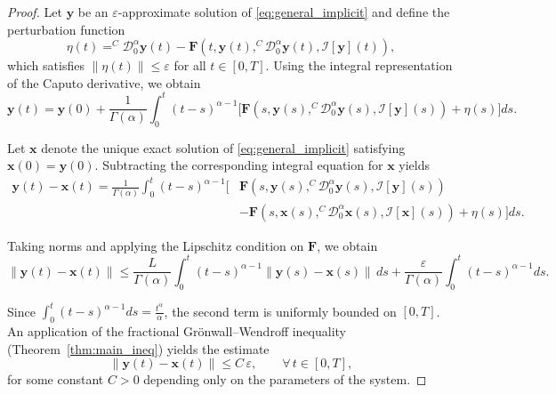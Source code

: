 \documentclass[12pt,a4paper]{article}
\numberwithin{equation}{section}
\begin{document}
	\begin{proof}
		Let $\mathbf{y}$ be an $\varepsilon$-approximate solution of \eqref{eq:general_implicit} and define the perturbation function
		\[
		\eta(t) = ^{C}\mathcal{D}_{0}^{\alpha}\mathbf{y}(t) - \mathbf{F}\!\left( t,\mathbf{y}(t), ^{C}\mathcal{D}_{0}^{\alpha}\mathbf{y}(t), \mathcal{I}[\mathbf{y}](t) \right),
		\]
		which satisfies $\|\eta(t)\|\le\varepsilon$ for all $t\in[0,T]$. Using the integral representation of the Caputo derivative, we obtain
		\begin{equation}
			\mathbf{y}(t) = \mathbf{y}(0) + \frac{1}{\Gamma(\alpha)} \int_0^t (t-s)^{\alpha-1} \Big[ \mathbf{F}\!\left( s,\mathbf{y}(s), ^{C}\mathcal{D}_{0}^{\alpha}\mathbf{y}(s), \mathcal{I}[\mathbf{y}](s) \right) + \eta(s) \Big] ds.
			\label{eq:y_integral_form}
		\end{equation}
		
		Let $\mathbf{x}$ denote the unique exact solution of \eqref{eq:general_implicit} satisfying $\mathbf{x}(0)=\mathbf{y}(0)$. Subtracting the corresponding integral equation for $\mathbf{x}$ yields
		\begin{equation}
			\begin{aligned}
				\mathbf{y}(t)-\mathbf{x}(t) = \frac{1}{\Gamma(\alpha)} \int_0^t (t-s)^{\alpha-1} \Big[ & \mathbf{F}\!\left( s,\mathbf{y}(s), ^{C}\mathcal{D}_{0}^{\alpha}\mathbf{y}(s), \mathcal{I}[\mathbf{y}](s) \right) \\
				& - \mathbf{F}\!\left( s,\mathbf{x}(s), ^{C}\mathcal{D}_{0}^{\alpha}\mathbf{x}(s), \mathcal{I}[\mathbf{x}](s) \right) + \eta(s) \Big] ds .
			\end{aligned}
			\label{eq:difference_equation}
		\end{equation}
		
		Taking norms and applying the Lipschitz condition on $\mathbf{F}$, we obtain
		\begin{equation}
			\|\mathbf{y}(t)-\mathbf{x}(t)\| \le \frac{L}{\Gamma(\alpha)} \int_0^t (t-s)^{\alpha-1} \|\mathbf{y}(s)-\mathbf{x}(s)\|\,ds + \frac{\varepsilon}{\Gamma(\alpha)} \int_0^t (t-s)^{\alpha-1} ds.
			\label{eq:norm_estimate}
		\end{equation}
		
		Since $\int_0^t (t-s)^{\alpha-1} ds = \frac{t^\alpha}{\alpha}$, the second term is uniformly bounded on $[0,T]$. An application of the fractional Grönwall--Wendroff inequality (Theorem~\ref{thm:main_ineq}) yields the estimate
		\begin{equation}
			\|\mathbf{y}(t)-\mathbf{x}(t)\| \le C\,\varepsilon, \qquad \forall\, t\in[0,T],
			\label{eq:stability_result}
		\end{equation}
		for some constant $C>0$ depending only on the parameters of the system.
	\end{proof}
	
\end{document}
